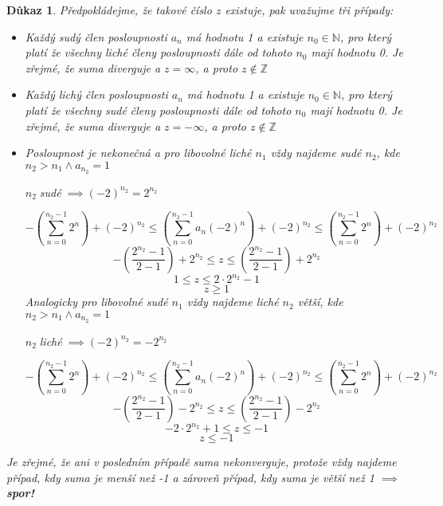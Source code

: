 \documentclass[12pt]{book}
\newtheorem*{dukaz}{Důkaz}
\begin{document}
\begin{dukaz}
	Předpokládejme, že takové číslo $z$ existuje, pak uvažujme tři případy:
	\begin{itemize}
		\item[$a)$]
		Každý sudý člen posloupnosti $a_n$ má hodnotu 1 a existuje $n_0\in\mathbb{N}$, pro který platí že všechny liché členy posloupnosti dále od tohoto $n_0$ mají hodnotu 0.
		Je zřejmé, že suma diverguje a $z=\infty$, a proto $z \notin \mathbb{Z}$
		\item[$b)$]Každý lichý člen posloupnosti $a_n$ má hodnotu 1 a existuje $n_0\in\mathbb{N}$, pro který platí že všechny sudé členy posloupnosti dále od tohoto $n_0$ mají hodnotu 0.
		Je zřejmé, že suma diverguje a $z=-\infty$, a proto $z \notin \mathbb{Z}$
		\item[$c)$] Posloupnost je nekonečná a pro libovolné liché $n_1$ vždy najdeme sudé $n_2$, kde $ n_2>n_1 \land a_{n_2}=1$
		\begin{center}$ n_2 \; $sudé$ \; \implies (-2)^{n_2} = 2^{n_2}$\end{center}
		$$-\left(\sum_{n=0}^{n_2-1}2^n\right)+(-2)^{n_2}\leq \left(\sum_{n=0}^{n_2-1}a_n(-2)^n\right)+(-2)^{n_2}  \leq\left(\sum_{n=0}^{n_2-1}2^n\right)+(-2)^{n_2}$$
		$$-\left(\frac{2^{n_2}-1}{2-1}\right)+2^{n_2}\leq z \leq\left(\frac{2^{n_2}-1}{2-1} \right)+2^{n_2}$$
		$$1\leq z\leq 2\cdot2^{n_2}-1$$
		$$z\ge1$$
		Analogicky pro libovolné sudé $n_1$ vždy najdeme liché $n_2$ větší, kde $ n_2>n_1 \land a_{n_2}=1$
		\begin{center}$ n_2 \; $liché$ \; \implies (-2)^{n_2} = -2^{n_2}$\end{center}
		$$-\left(\sum_{n=0}^{n_2-1}2^n\right)+(-2)^{n_2}\leq \left(\sum_{n=0}^{n_2-1}a_n(-2)^n\right)+(-2)^{n_2}  \leq\left(\sum_{n=0}^{n_2-1}2^n\right)+(-2)^{n_2}$$
		$$-\left(\frac{2^{n_2}-1}{2-1}\right)-2^{n_2}\leq   z \leq\left(\frac{2^{n_2}-1}{2-1} \right)-2^{n_2}$$
		$$-2\cdot2^{n_2}+1\leq z\leq -1$$
		$$z\le-1$$
		
	\end{itemize}
	Je zřejmé, že ani v posledním případě suma nekonverguje, protože vždy najdeme případ, kdy suma je menší než -1 a zároveň případ, kdy suma je větší než 1 $\implies$ \textbf{spor!}
	
\end{dukaz}
\end{document}
